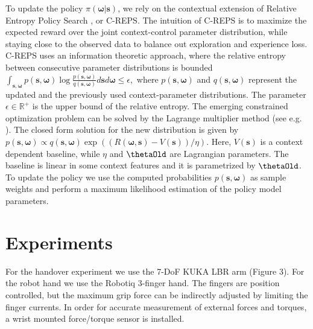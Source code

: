 To update the policy $\pi( {\boldsymbol{\omega}} |  {\boldsymbol{s}} )$, we rely on the contextual extension of Relative Entropy Policy Search \citep{Kupcsik2013,Deisenroth2013}, or C-REPS. The intuition of C-REPS is to maximize the expected reward over the joint context-control parameter distribution, while staying close to the observed data to balance  out exploration and experience loss. C-REPS uses an information theoretic approach, where the relative entropy between consecutive  parameter distributions is bounded $ \int_{  {\boldsymbol{s}} , {\boldsymbol{\omega}} } p(  {\boldsymbol{s}} ,  {\boldsymbol{\omega}} ) \log 
 \frac{p(  {\boldsymbol{s}} ,  {\boldsymbol{\omega}} )}{q(  {\boldsymbol{s}} , {\boldsymbol{\omega}} )}d  {\boldsymbol{s}}  d {\boldsymbol{\omega}}  \leq \epsilon , $ where $p(  {\boldsymbol{s}} , {\boldsymbol{\omega}} )$ and $q(  {\boldsymbol{s}} ,  {\boldsymbol{\omega}} )$ represent the updated and the previously used context-parameter distributions. The parameter         $\epsilon \in \mathbb{R}^+$ is the upper bound of the relative entropy. The emerging constrained optimization problem can be solved by the Lagrange multiplier method (see e.g. \citep{Kupcsik_AIJ_2015}). The closed form solution for the  new distribution is given by $ p(  {\boldsymbol{s}} , {\boldsymbol{\omega}} ) \propto {q(  {\boldsymbol{s}} ,   {\boldsymbol{\omega}}  )}  \exp\left((R( {\boldsymbol{\omega}} ,   {\boldsymbol{s}} ) - V(  {\boldsymbol{s}} ))/\eta\right).
 $
  Here, $V(  {\boldsymbol{s}} )$ is a context dependent baseline, while $\eta$ and $\boldsymbol{\boldsymbol{\thetaOld}}$
  are Lagrangian parameters. The baseline is linear in some context features and it is parametrized by $\boldsymbol{\boldsymbol{\thetaOld}}$. To update the policy we use the computed probabilities $p(  {\boldsymbol{s}} , {\boldsymbol{\omega}} )$ as sample weights and perform a maximum likelihood estimation of the policy model parameters.

\section{Experiments}
\label{sec:expr}

For the handover experiment we use the 7-DoF KUKA LBR arm (Figure 3). For the robot hand we use the Robotiq 3-finger hand. The fingers are position controlled, but the maximum grip force can be indirectly adjusted by limiting the finger currents. In order for accurate measurement of external forces and torques, a wrist mounted force/torque sensor is installed.

